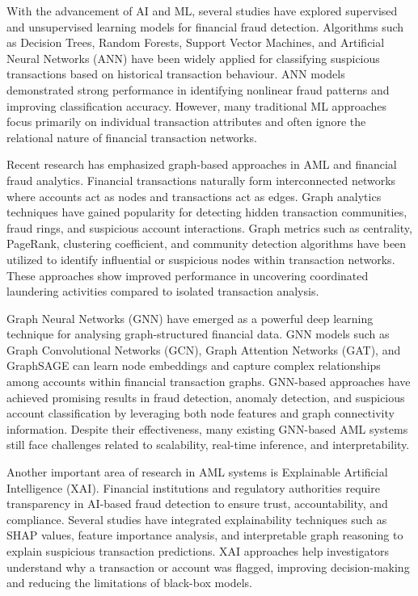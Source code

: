 \documentclass[conference]{IEEEtran}
\begin{document}
With the advancement of AI and ML, several studies have explored supervised and unsupervised learning models for financial fraud detection. Algorithms such as Decision Trees, Random Forests, Support Vector Machines, and Artificial Neural Networks (ANN) have been widely applied for classifying suspicious transactions based on historical transaction behaviour. ANN models demonstrated strong performance in identifying nonlinear fraud patterns and improving classification accuracy. However, many traditional ML approaches focus primarily on individual transaction attributes and often ignore the relational nature of financial transaction networks.

Recent research has emphasized graph-based approaches in AML and financial fraud analytics. Financial transactions naturally form interconnected networks where accounts act as nodes and transactions act as edges. Graph analytics techniques have gained popularity for detecting hidden transaction communities, fraud rings, and suspicious account interactions. Graph metrics such as centrality, PageRank, clustering coefficient, and community detection algorithms have been utilized to identify influential or suspicious nodes within transaction networks. These approaches show improved performance in uncovering coordinated laundering activities compared to isolated transaction analysis.

Graph Neural Networks (GNN) have emerged as a powerful deep learning technique for analysing graph-structured financial data. GNN models such as Graph Convolutional Networks (GCN), Graph Attention Networks (GAT), and GraphSAGE can learn node embeddings and capture complex relationships among accounts within financial transaction graphs. GNN-based approaches have achieved promising results in fraud detection, anomaly detection, and suspicious account classification by leveraging both node features and graph connectivity information. Despite their effectiveness, many existing GNN-based AML systems still face challenges related to scalability, real-time inference, and interpretability.

Another important area of research in AML systems is Explainable Artificial Intelligence (XAI). Financial institutions and regulatory authorities require transparency in AI-based fraud detection to ensure trust, accountability, and compliance. Several studies have integrated explainability techniques such as SHAP values, feature importance analysis, and interpretable graph reasoning to explain suspicious transaction predictions. XAI approaches help investigators understand why a transaction or account was flagged, improving decision-making and reducing the limitations of black-box models.
\end{document}
